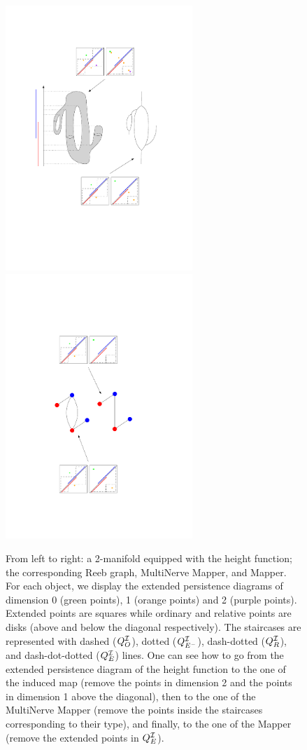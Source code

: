 \begin{figure}[h]
\centering
\includegraphics[height=10cm]{figures/ExDict1}\ \ \ \ \ \ \ \ \includegraphics[height=10cm]{figures/ExDict2}
\caption[Mapper as a pixelization of the Reeb graph]{From left to right: a 2-manifold equipped with the height
  function; the corresponding Reeb graph, MultiNerve Mapper, and
  Mapper. For each object, we display the extended persistence diagrams of
  dimension 0 (green points), 1 (orange points) and 2 (purple
  points). Extended points are squares while ordinary and relative
  points are disks (above and below the diagonal respectively).  The
  staircases are represented with dashed ($Q_O^{\mathcal{I}}$), dotted ($Q_{E^-}^{\mathcal{I}}$),
  dash-dotted ($Q_R^{\mathcal{I}}$), and dash-dot-dotted ($Q_{E}^{\mathcal{I}}$) lines.  
  One can see how to go from the extended
  persistence diagram of the height function to the one of the induced map
  (remove the points in dimension 2 and the points in dimension 1
  above the diagonal), then to the one of the MultiNerve Mapper
  (remove the points inside the staircases corresponding to their
  type), and finally, to the one of the Mapper (remove the extended
  points in $Q_{E}^{\mathcal{I}}$).}
\label{fig:ExDict}
\end{figure}



